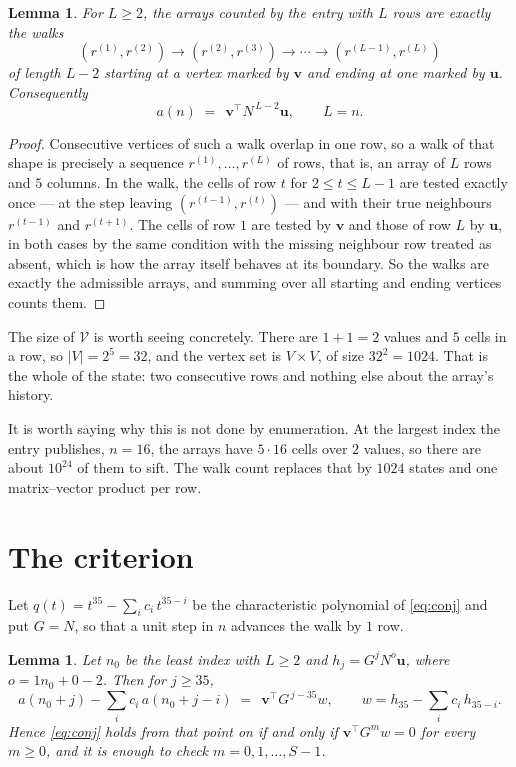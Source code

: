 \documentclass[11pt,a4paper]{article}
\theoremstyle{plain}
\newtheorem{lemma}[theorem]{Lemma}
\theoremstyle{definition}
\begin{document}
\begin{lemma}\label{lem:walk}
For $L\ge2$, the arrays counted by the entry with $L$ rows are exactly the walks
\[
(r^{(1)},r^{(2)})\to(r^{(2)},r^{(3)})\to\cdots\to(r^{(L-1)},r^{(L)})
\]
of length $L-2$ starting at a vertex marked by $\mathbf{v}$ and ending at one marked by
$\mathbf{u}$. Consequently
\[
a(n)\;=\;\,\mathbf{v}^{\!\top}N^{\,L-2}\mathbf{u},\qquad L=n .
\]
\end{lemma}

\begin{proof}
Consecutive vertices of such a walk overlap in one row, so a walk of that shape is
precisely a sequence $r^{(1)},\dots,r^{(L)}$ of rows, that is, an array of $L$ rows
and $5$ columns. In the walk, the cells of row $t$ for $2\le t\le L-1$ are tested
exactly once --- at the step leaving $(r^{(t-1)},r^{(t)})$ --- and with their true
neighbours $r^{(t-1)}$ and $r^{(t+1)}$. The cells of row $1$ are tested by
$\mathbf{v}$ and those of row $L$ by $\mathbf{u}$, in both cases by the same condition
with the missing neighbour row treated as absent, which is how the array itself behaves at
its boundary. So the walks are exactly the admissible arrays, and summing over all starting
and ending vertices counts them.
\end{proof}


The size of $\mathcal V$ is worth seeing concretely. There are $1+1=2$ values
and $5$ cells in a row, so $|V|=2^{5}=32$, and the vertex set is
$V\times V$, of size $32^2=1024$. That is the whole of the state: two consecutive
rows and nothing else about the array's history.

It is worth saying why this is not done by enumeration. At the largest index the entry
publishes, $n=16$, the arrays have $5\cdot16$ cells over
$2$ values, so there are about $10^{24}$ of them to sift. The
walk count replaces that by $1024$ states and one matrix--vector product per row.
\section{The criterion}

Let $q(t)=t^{35}-\sum_i c_i\,t^{35-i}$ be the characteristic polynomial of
\eqref{eq:conj} and put $G=N$, so that a unit step in $n$ advances the walk by
$1$ row.

\begin{lemma}\label{lem:crit}
Let $n_0$ be the least index with $L\ge2$ and $h_j=G^{j}N^{o}\mathbf{u}$, where
$o=1n_0+0-2$. Then for $j\ge35$,
\[
a(n_0+j)-\sum_i c_i\,a(n_0+j-i)\;=\;\,\mathbf{v}^{\!\top}G^{\,j-35}w,
\qquad w=h_{35}-\sum_i c_i\,h_{35-i} .
\]
Hence \eqref{eq:conj} holds from that point on if and only if
$\mathbf{v}^{\!\top}G^{m}w=0$ for every $m\ge0$, and it is enough to check
$m=0,1,\dots,S-1$.
\end{lemma}
\end{document}
